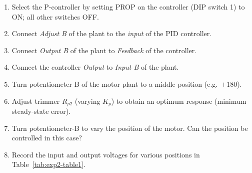 \begin{procedure}
  \begin{enumerate}
    \item Select the P-controller by setting PROP on the controller (DIP switch 1) to ON; all other switches OFF.
    \item Connect \textit{Adjust B} of the plant to the \textit{input} of the PID controller.
    \item Connect \textit{Output B} of the plant to \textit{Feedback} of the controller.
    \item Connect the controller \textit{Output} to \textit{Input B} of the plant.
    \item Turn potentiometer-B of the motor plant to a middle position (e.g.\ $+180$).
    \item Adjust trimmer $R_{p2}$ (varying $K_p$) to obtain an optimum response (minimum steady-state error).
    \item Turn potentiometer-B to vary the position of the motor. Can the position be controlled in this case?
    \item Record the input and output voltages for various positions in Table~\ref{tab:exp2-table1}.
  \end{enumerate}


\end{procedure}
